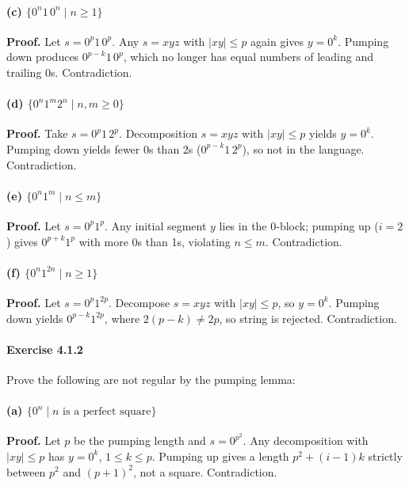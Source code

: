 \documentclass{article}
\theoremstyle{theorem}
\theoremstyle{definition}
\theoremstyle{remark}
\begin{document}
\paragraph{(c) \(\{0^n1\,0^n\mid n\ge1\}\)}
\textbf{Proof.} Let \(s=0^p1\,0^p\). Any \(s=xyz\) with \(\lvert xy\rvert\le p\) again gives \(y=0^k\). Pumping down produces \(0^{p-k}1\,0^p\), which no longer has equal numbers of leading and trailing 0s. Contradiction.

\paragraph{(d) \(\{0^n1^m2^n\mid n,m\ge0\}\)}
\textbf{Proof.} Take \(s=0^p1\,2^p\). Decomposition \(s=xyz\) with \(\lvert xy\rvert\le p\) yields \(y=0^k\). Pumping down yields fewer 0s than 2s (\(0^{p-k}1\,2^p\)), so not in the language. Contradiction.

\paragraph{(e) \(\{0^n1^m\mid n\le m\}\)}
\textbf{Proof.} Let \(s=0^p1^p\). Any initial segment \(y\) lies in the 0-block; pumping up (\(i=2\)) gives \(0^{p+k}1^p\) with more 0s than 1s, violating \(n\le m\). Contradiction.

\paragraph{(f) \(\{0^n1^{2n}\mid n\ge1\}\)}
\textbf{Proof.} Let \(s=0^p1^{2p}\). Decompose \(s=xyz\) with \(\lvert xy\rvert\le p\), so \(y=0^k\). Pumping down yields \(0^{p-k}1^{2p}\), where \(2(p-k)\neq2p\), so string is rejected. Contradiction.

\paragraph*{Exercise 4.1.2}
Prove the following are not regular by the pumping lemma:

\paragraph{(a) \(\{0^n\mid n\text{ is a perfect square}\}\)}
\textbf{Proof.} Let \(p\) be the pumping length and \(s=0^{p^2}\). Any decomposition with \(\lvert xy\rvert\le p\) has \(y=0^k\), \(1\le k\le p\). Pumping up gives a length \(p^2 + (i-1)k\) strictly between \(p^2\) and \((p+1)^2\), not a square. Contradiction.
\end{document}
